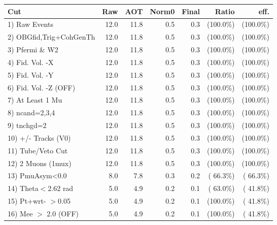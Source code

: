  \begin{table}[h!]\centering
 \begin{tabular}{||l||r|r|r|r|r|r||}
 \hline
 \hline
 Cut & Raw & AOT & Norm0 & Final & Ratio & eff.       \\
 \hline
  1) Raw Events           &         12.0 &         11.8 &          0.5 &          0.3 & (100.0\%) & (100.0\%) \\
  2) OBGfid,Trig+CohGenTh &         12.0 &         11.8 &          0.5 &          0.3 & (100.0\%) & (100.0\%) \\
  3) Pfermi \& W2         &         12.0 &         11.8 &          0.5 &          0.3 & (100.0\%) & (100.0\%) \\
  4) Fid. Vol. -X         &         12.0 &         11.8 &          0.5 &          0.3 & (100.0\%) & (100.0\%) \\
  5) Fid. Vol. -Y         &         12.0 &         11.8 &          0.5 &          0.3 & (100.0\%) & (100.0\%) \\
  6) Fid. Vol. -Z (OFF)   &         12.0 &         11.8 &          0.5 &          0.3 & (100.0\%) & (100.0\%) \\
  7) At Least 1 Mu        &         12.0 &         11.8 &          0.5 &          0.3 & (100.0\%) & (100.0\%) \\
  8) ncand=2,3,4          &         12.0 &         11.8 &          0.5 &          0.3 & (100.0\%) & (100.0\%) \\
  9) tnchgd=2             &         12.0 &         11.8 &          0.5 &          0.3 & (100.0\%) & (100.0\%) \\
 10) +/- Tracks (V0)      &         12.0 &         11.8 &          0.5 &          0.3 & (100.0\%) & (100.0\%) \\
 11) Tube/Veto Cut        &         12.0 &         11.8 &          0.5 &          0.3 & (100.0\%) & (100.0\%) \\
 12) 2 Muons (1mux)       &         12.0 &         11.8 &          0.5 &          0.3 & (100.0\%) & (100.0\%) \\
 13) PmuAsym<0.0          &          8.0 &          7.8 &          0.3 &          0.2 & ( 66.3\%) & ( 66.3\%) \\
 14) Theta$<$2.62 rad     &          5.0 &          4.9 &          0.2 &          0.1 & ( 63.0\%) & ( 41.8\%) \\
 15) Pt+wrt- $>$0.05      &          5.0 &          4.9 &          0.2 &          0.1 & (100.0\%) & ( 41.8\%) \\
 16) Mee $>$ 2.0  (OFF)   &          5.0 &          4.9 &          0.2 &          0.1 & (100.0\%) & ( 41.8\%) \\

\end{tabular}
\end{table}
